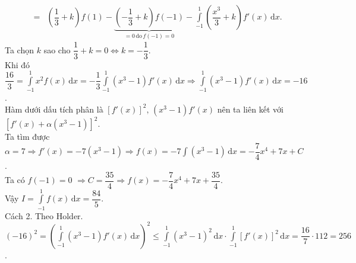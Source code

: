 \begin{ex}
{\begin{eqnarray*}
			&=&\left(\dfrac{1}{3}+k\right)f(1)-\underbrace{\left(-\dfrac{1}{3}+k\right)f(-1)}_{=0 \, \text{do}\, f(-1)=0}-\displaystyle\int\limits_{-1}^1\left(\dfrac{x^3}{3}+k\right)f'(x)\mathrm{\,d}x.
		\end{eqnarray*}
		Ta chọn $k$ sao cho $\dfrac{1}{3}+k=0\Leftrightarrow k=-\dfrac{1}{3}$.\\
		Khi đó $\dfrac{16}{3}=\displaystyle\int\limits_{-1}^1 x^2f(x)\mathrm{\,d}x=-\dfrac{1}{3}\displaystyle\int\limits_{-1}^1\left(x^3-1\right)f'(x)\mathrm{\,d}x\Rightarrow  \displaystyle\int\limits_{-1}^1\left(x^3-1\right)f'(x)\mathrm{\,d}x=-16$.\\
		Hàm dưới dấu tích phân là $[f'(x)]^2,\,\left(x^3-1\right)f'(x)$ nên ta liên kết với $\left[f'(x)+\alpha\left(x^3-1\right)\right]^2$.\\
		Ta tìm được $\alpha=7\Rightarrow  f'(x)=-7\left(x^3-1\right)\Rightarrow f(x)=-7\displaystyle\int\left(x^3-1\right)\mathrm{\,d}x=-\dfrac{7}{4}x^4+7x+C$.\\
		Ta có  ${{f(-1)=0}}$ $\Rightarrow C=\dfrac{35}{4}\Rightarrow  f(x)=-\dfrac{7}{4}x^4+7x+\dfrac{35}{4}$.\\ Vậy $I=\displaystyle\int\limits_{-1}^1 f(x)\mathrm{\,d}x=\dfrac{84}{5}$.\\
		Cách 2. Theo Holder.\\
		$(-16)^2=\left(\displaystyle\int\limits_{-1}^1\left(x^3-1\right)f'(x)\mathrm{\,d}x\right)^2\leq\displaystyle\int\limits_{-1}^1\left(x^3-1\right)^2\mathrm{\,d}x\cdot\displaystyle\int\limits_{-1}^1[f'(x)]^2\mathrm{\,d}x=\dfrac{16}{7}\cdot 112=256$.}
\end{ex}
